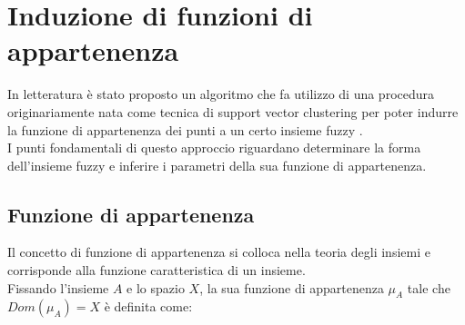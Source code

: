 \documentclass[12pt]{report}
\theoremstyle{definition}
\begin{document}
\section{Induzione di funzioni di appartenenza} \label{induzione}
In letteratura è stato proposto un algoritmo che fa utilizzo di una procedura originariamente nata come tecnica di support vector clustering per poter indurre la funzione di appartenenza dei punti a un certo insieme fuzzy \cite{1}.
\\
I punti fondamentali di questo approccio riguardano determinare la forma dell'insieme fuzzy e inferire i parametri della sua funzione di appartenenza.

\subsection{Funzione di appartenenza} \label{membership}
Il concetto di funzione di appartenenza si colloca nella teoria degli insiemi e corrisponde alla funzione caratteristica di un insieme.
\\
Fissando l'insieme $A$ e lo spazio $X$, la sua funzione di appartenenza $\mu_A$ tale che $Dom(\mu_A) = X$ è definita come:
\end{document}
